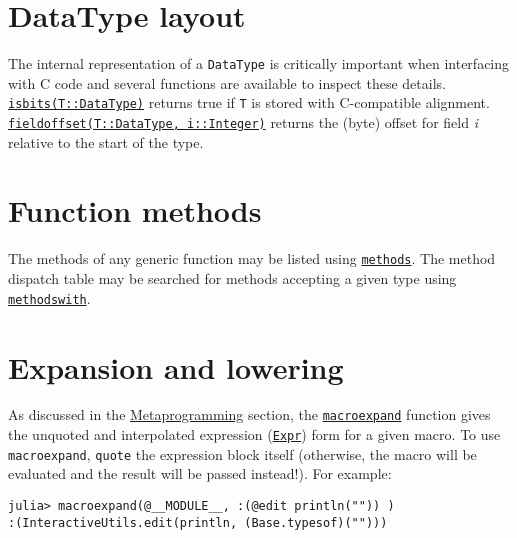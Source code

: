 \hypertarget{11957448814310282424}{}


\section{DataType layout}



The internal representation of a \texttt{DataType} is critically important when interfacing with C code and several functions are available to inspect these details. \hyperlink{12980593021531333073}{\texttt{isbits(T::DataType)}} returns true if \texttt{T} is stored with C-compatible alignment. \hyperlink{6956980533195055227}{\texttt{fieldoffset(T::DataType, i::Integer)}} returns the (byte) offset for field \emph{i} relative to the start of the type.



\hypertarget{9741782790992203943}{}


\section{Function methods}



The methods of any generic function may be listed using \hyperlink{3025953302266245919}{\texttt{methods}}. The method dispatch table may be searched for methods accepting a given type using \hyperlink{1845157398882896709}{\texttt{methodswith}}.



\hypertarget{10529563115945815287}{}


\section{Expansion and lowering}



As discussed in the \hyperlink{15430858583934124136}{Metaprogramming} section, the \hyperlink{8018172489611994488}{\texttt{macroexpand}} function gives the unquoted and interpolated expression (\hyperlink{17120496304147995299}{\texttt{Expr}}) form for a given macro. To use \texttt{macroexpand}, \texttt{quote} the expression block itself (otherwise, the macro will be evaluated and the result will be passed instead!). For example:




\begin{verbatim}
julia> macroexpand(@__MODULE__, :(@edit println("")) )
:(InteractiveUtils.edit(println, (Base.typesof)("")))
\end{verbatim}




